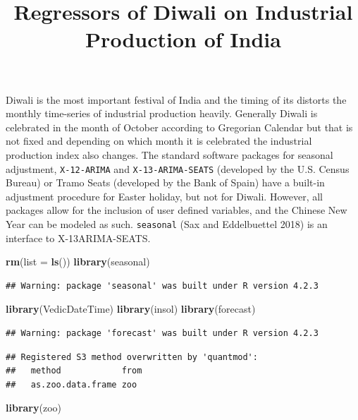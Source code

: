 \documentclass[
]{article}
\title{Regressors of Diwali on Industrial Production of India}
\author{}
\date{\vspace{-2.5em}}
\newenvironment{Shaded}{\begin{snugshade}}{\end{snugshade}}
\newcommand{\AttributeTok}[1]{\textcolor[rgb]{0.13,0.29,0.53}{#1}}
\newcommand{\FunctionTok}[1]{\textcolor[rgb]{0.13,0.29,0.53}{\textbf{#1}}}
\newcommand{\NormalTok}[1]{#1}
\begin{document}
\maketitle

Diwali is the most important festival of India and the timing of its
distorts the monthly time-series of industrial production heavily.
Generally Diwali is celebrated in the month of October according to
Gregorian Calendar but that is not fixed and depending on which month it
is celebrated the industrial production index also changes. The standard
software packages for seasonal adjustment, \texttt{X-12-ARIMA} and
\texttt{X-13-ARIMA-SEATS} (developed by the U.S. Census Bureau) or Tramo
Seats (developed by the Bank of Spain) have a built-in adjustment
procedure for Easter holiday, but not for Diwali. However, all packages
allow for the inclusion of user defined variables, and the Chinese New
Year can be modeled as such. \texttt{seasonal} (Sax and Eddelbuettel
2018) is an interface to X-13ARIMA-SEATS.

\begin{Shaded}
\begin{Highlighting}[]
\FunctionTok{rm}\NormalTok{(}\AttributeTok{list =} \FunctionTok{ls}\NormalTok{())}
\FunctionTok{library}\NormalTok{(seasonal)}
\end{Highlighting}
\end{Shaded}

\begin{verbatim}
## Warning: package 'seasonal' was built under R version 4.2.3
\end{verbatim}

\begin{Shaded}
\begin{Highlighting}[]
\FunctionTok{library}\NormalTok{(VedicDateTime)}
\FunctionTok{library}\NormalTok{(insol)}
\FunctionTok{library}\NormalTok{(forecast)}
\end{Highlighting}
\end{Shaded}

\begin{verbatim}
## Warning: package 'forecast' was built under R version 4.2.3
\end{verbatim}

\begin{verbatim}
## Registered S3 method overwritten by 'quantmod':
##   method            from
##   as.zoo.data.frame zoo
\end{verbatim}

\begin{Shaded}
\begin{Highlighting}[]
\FunctionTok{library}\NormalTok{(zoo)}
\end{Highlighting}
\end{Shaded}
\end{document}
